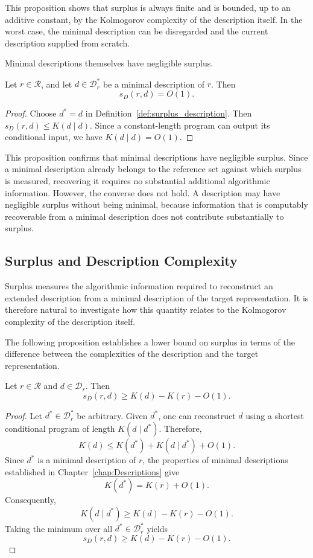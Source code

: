 This proposition shows that surplus is always finite and is bounded, up to an additive constant, by the Kolmogorov complexity of the description itself. In the worst case, the minimal description can be disregarded and the current description supplied from scratch.

Minimal descriptions themselves have negligible surplus.

\begin{proposition}
\label{prop:surplus_minimal_description}
Let $r\in\mathcal R$, and let $d\in\mathcal D_r^\ast$ be a
minimal description of $r$. Then
\[
s_D(r,d)=O(1).
\]
\end{proposition}
\begin{proof}
Choose $d^\ast=d$ in Definition~\ref{def:surplus_description}. Then $s_D(r,d)\le K(d\mid d)$. Since a constant-length program can output its conditional input, we have $K(d\mid d)=O(1)$.
\end{proof}

This proposition confirms that minimal descriptions have negligible surplus. Since a minimal description already belongs to the reference set against which surplus is measured, recovering it requires no substantial additional algorithmic information. However, the converse does not hold. A description may have negligible surplus without being minimal, because information that is computably recoverable from a minimal description does not contribute substantially to surplus.


\subsection*{Surplus and Description Complexity}

Surplus measures the algorithmic information required to reconstruct an extended description from a minimal description of the target representation. It is therefore natural to investigate how this quantity relates to the Kolmogorov complexity of the description itself.

The following proposition establishes a lower bound on surplus in terms of the difference between the complexities of the description and the target representation.

\begin{proposition}
\label{prop:surplus_description_lower_bound}
Let $r\in\mathcal R$ and $d\in\mathcal D_r$. Then
\[
s_D(r,d)\ge K(d)-K(r)-O(1).
\]
\end{proposition}
\begin{proof}
Let $d^\ast\in\mathcal D_r^\ast$ be arbitrary. Given $d^\ast$, one can reconstruct $d$ using a shortest conditional program of length $K(d\mid d^\ast)$. Therefore,
\[
K(d) \le K(d^\ast)+K(d\mid d^\ast) + O(1).
\]
Since $d^\ast$ is a minimal description of $r$, the properties of minimal descriptions established in
Chapter~\ref{chap:Descriptions} give
\[
K(d^\ast) = K(r) + O(1).
\]
Consequently,
\[
K(d\mid d^\ast) \ge K(d)-K(r)-O(1).
\]
Taking the minimum over all $d^\ast\in\mathcal D_r^\ast$ yields
\[
s_D(r,d)\ge K(d)-K(r)-O(1).
\]
\end{proof}

